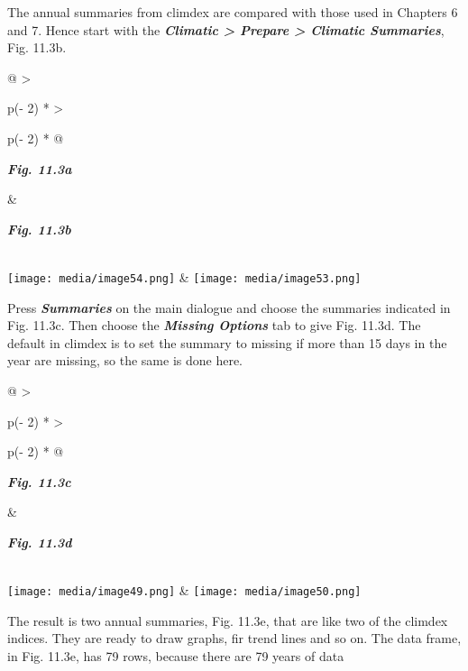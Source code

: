 \documentclass[
  letterpaper,
  DIV=11,
  numbers=noendperiod]{scrreprt}
\begin{document}
The annual summaries from climdex are compared with those used in
Chapters 6 and 7. Hence start with the \textbf{\emph{Climatic
\textgreater{} Prepare \textgreater{} Climatic Summaries}}, Fig. 11.3b.

\begin{longtable}[]{@{}
  >{\raggedright\arraybackslash}p{(\columnwidth - 2\tabcolsep) * }
  >{\raggedright\arraybackslash}p{(\columnwidth - 2\tabcolsep) * }@{}}
\toprule\noalign{}
\begin{minipage}[b]{\linewidth}\raggedright
\textbf{\emph{Fig. 11.3a}}
\end{minipage} & \begin{minipage}[b]{\linewidth}\raggedright
\textbf{\emph{Fig. 11.3b}}
\end{minipage} \\
\midrule\noalign{}
\endhead
\bottomrule\noalign{}
\endlastfoot
\texttt{[image: media/image54.png]} &
\texttt{[image: media/image53.png]} \\
\end{longtable}

Press \textbf{\emph{Summaries}} on the main dialogue and choose the
summaries indicated in Fig. 11.3c. Then choose the \textbf{\emph{Missing
Options}} tab to give Fig. 11.3d. The default in climdex is to set the
summary to missing if more than 15 days in the year are missing, so the
same is done here.

\begin{longtable}[]{@{}
  >{\raggedright\arraybackslash}p{(\columnwidth - 2\tabcolsep) * }
  >{\raggedright\arraybackslash}p{(\columnwidth - 2\tabcolsep) * }@{}}
\toprule\noalign{}
\begin{minipage}[b]{\linewidth}\raggedright
\textbf{\emph{Fig. 11.3c}}
\end{minipage} & \begin{minipage}[b]{\linewidth}\raggedright
\textbf{\emph{Fig. 11.3d}}
\end{minipage} \\
\midrule\noalign{}
\endhead
\bottomrule\noalign{}
\endlastfoot
\texttt{[image: media/image49.png]} &
\texttt{[image: media/image50.png]} \\
\end{longtable}

The result is two annual summaries, Fig. 11.3e, that are like two of the
climdex indices. They are ready to draw graphs, fir trend lines and so
on. The data frame, in Fig. 11.3e, has 79 rows, because there are 79
years of data
\end{document}
